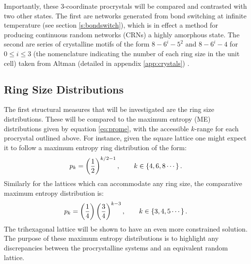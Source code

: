 Importantly, these 3\--coordinate procrystals will be compared and contrasted with two other states.
The first are networks generated from bond switching at infinite temperature (see section \ref{s:bondswitch}), which is in effect a method for producing continuous random networks (CRNs) \ie{} a highly amorphous state.
The second are series of crystalline motifs of the form $8-6^i-5^2$ and $8-6^i-4$ for $0\leq i\leq3$ (the nomenclature indicating the number of each ring size in the unit cell) taken from Altman \etal{} (detailed in appendix \ref{app:crystals}) \cite{Malashevich2016}.

\subsection{Ring Size Distributions}
\label{s:pro3pk}

The first structural measures that will be investigated are the ring size distributions.
These will be compared to the maximum entropy (ME) distributions given by equation \ref{eq:prome}, with the accessible $k$\--range for each procrystal outlined %
 above. 
For instance, given the square lattice one might expect it to follow a maximum entropy ring distribution of the form:
\begin{equation}
	p_k = \left(\frac{1}{2}\right)^{k/2-1}, \qquad k\in\left\{4,6,8\cdots\right\}.
\end{equation}
Similarly for the lattices which can accommodate any ring size, the comparative maximum entropy distribution is:
\begin{equation}
	p_k = \left(\frac{1}{4}\right)\left(\frac{3}{4}\right)^{k-3}, \qquad k\in\left\{3,4,5\cdots\right\}.
\end{equation}
The trihexagonal lattice will be shown to have an even more constrained solution.
The purpose of these maximum entropy distributions is to highlight any discrepancies between the procrystalline systems and an equivalent random lattice.

